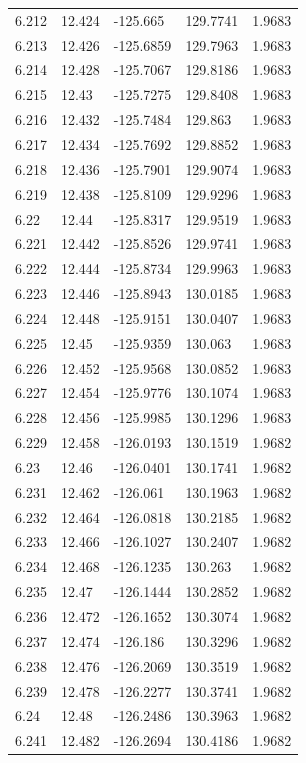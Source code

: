 \begin{tabular}{lllll}
6.212 & 12.424 & -125.665 & 129.7741 & 1.9683 \\
6.213 & 12.426 & -125.6859 & 129.7963 & 1.9683 \\
6.214 & 12.428 & -125.7067 & 129.8186 & 1.9683 \\
6.215 & 12.43 & -125.7275 & 129.8408 & 1.9683 \\
6.216 & 12.432 & -125.7484 & 129.863 & 1.9683 \\
6.217 & 12.434 & -125.7692 & 129.8852 & 1.9683 \\
6.218 & 12.436 & -125.7901 & 129.9074 & 1.9683 \\
6.219 & 12.438 & -125.8109 & 129.9296 & 1.9683 \\
6.22 & 12.44 & -125.8317 & 129.9519 & 1.9683 \\
6.221 & 12.442 & -125.8526 & 129.9741 & 1.9683 \\
6.222 & 12.444 & -125.8734 & 129.9963 & 1.9683 \\
6.223 & 12.446 & -125.8943 & 130.0185 & 1.9683 \\
6.224 & 12.448 & -125.9151 & 130.0407 & 1.9683 \\
6.225 & 12.45 & -125.9359 & 130.063 & 1.9683 \\
6.226 & 12.452 & -125.9568 & 130.0852 & 1.9683 \\
6.227 & 12.454 & -125.9776 & 130.1074 & 1.9683 \\
6.228 & 12.456 & -125.9985 & 130.1296 & 1.9683 \\
6.229 & 12.458 & -126.0193 & 130.1519 & 1.9682 \\
6.23 & 12.46 & -126.0401 & 130.1741 & 1.9682 \\
6.231 & 12.462 & -126.061 & 130.1963 & 1.9682 \\
6.232 & 12.464 & -126.0818 & 130.2185 & 1.9682 \\
6.233 & 12.466 & -126.1027 & 130.2407 & 1.9682 \\
6.234 & 12.468 & -126.1235 & 130.263 & 1.9682 \\
6.235 & 12.47 & -126.1444 & 130.2852 & 1.9682 \\
6.236 & 12.472 & -126.1652 & 130.3074 & 1.9682 \\
6.237 & 12.474 & -126.186 & 130.3296 & 1.9682 \\
6.238 & 12.476 & -126.2069 & 130.3519 & 1.9682 \\
6.239 & 12.478 & -126.2277 & 130.3741 & 1.9682 \\
6.24 & 12.48 & -126.2486 & 130.3963 & 1.9682 \\
6.241 & 12.482 & -126.2694 & 130.4186 & 1.9682 \\

\end{tabular}
